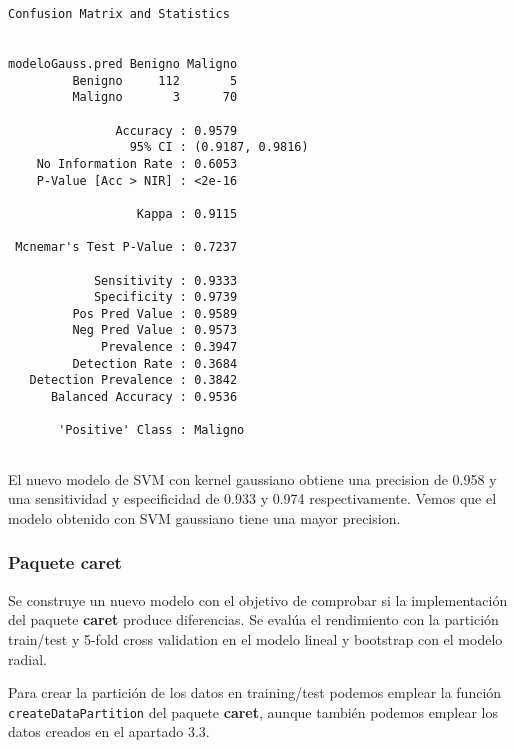\documentclass[
]{article}
\begin{document}
\begin{verbatim}
Confusion Matrix and Statistics

                
modeloGauss.pred Benigno Maligno
         Benigno     112       5
         Maligno       3      70
                                          
               Accuracy : 0.9579          
                 95% CI : (0.9187, 0.9816)
    No Information Rate : 0.6053          
    P-Value [Acc > NIR] : <2e-16          
                                          
                  Kappa : 0.9115          
                                          
 Mcnemar's Test P-Value : 0.7237          
                                          
            Sensitivity : 0.9333          
            Specificity : 0.9739          
         Pos Pred Value : 0.9589          
         Neg Pred Value : 0.9573          
             Prevalence : 0.3947          
         Detection Rate : 0.3684          
   Detection Prevalence : 0.3842          
      Balanced Accuracy : 0.9536          
                                          
       'Positive' Class : Maligno         
                                          
\end{verbatim}

El nuevo modelo de SVM con kernel gaussiano obtiene una precision de
0.958 y una sensitividad y especificidad de 0.933 y 0.974
respectivamente. Vemos que el modelo obtenido con SVM gaussiano tiene
una mayor precision.

\hypertarget{paquete-caret}{%
\subsubsection{Paquete caret}\label{paquete-caret}}

Se construye un nuevo modelo con el objetivo de comprobar si la
implementación del paquete \textbf{caret} produce diferencias. Se evalúa
el rendimiento con la partición train/test y 5-fold cross validation en
el modelo lineal y bootstrap con el modelo radial.

Para crear la partición de los datos en training/test podemos emplear la
función \texttt{createDataPartition} del paquete \textbf{caret}, aunque
también podemos emplear los datos creados en el apartado 3.3.
\end{document}
